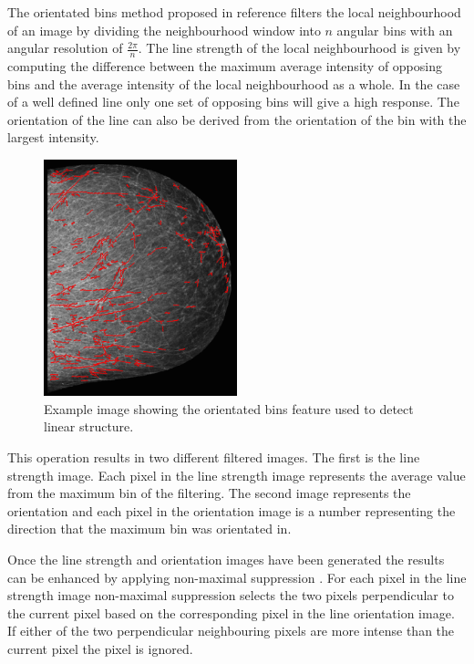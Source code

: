 The orientated bins method proposed in reference \cite{zwiggelaar1996finding} filters the local neighbourhood of an image by dividing the neighbourhood window into $n$ angular bins with an angular resolution of $\frac{2 \pi}{n}$. The line strength of the local neighbourhood is given by computing the difference between the maximum average intensity of opposing bins and the average intensity of the local neighbourhood as a whole. In the case of a well defined line only one set of opposing bins will give a high response. The orientation of the line can also be derived from the orientation of the bin with the largest intensity. 


\begin{figure}[H]
	\label{fig:linear-structure}
	\centering
	\includegraphics[width=0.5\textwidth]{Images/linear-structure.png}	
	\caption{Example image showing the orientated bins feature used to detect linear structure.}
\end{figure}

This operation results in two different filtered images. The first is the line strength image. Each pixel in the line strength image represents the average value from the maximum bin of the filtering. The second image represents the orientation and each pixel in the orientation image is a number representing the direction that the maximum bin was orientated in.

Once the line strength and orientation images have been generated the results can be enhanced by applying non-maximal suppression \cite{sonka2014image}. For each pixel in the line strength image non-maximal suppression selects the two pixels perpendicular to the current pixel based on the corresponding pixel in the line orientation image. If either of the two perpendicular neighbouring pixels are more intense than the current pixel the pixel is ignored. 

